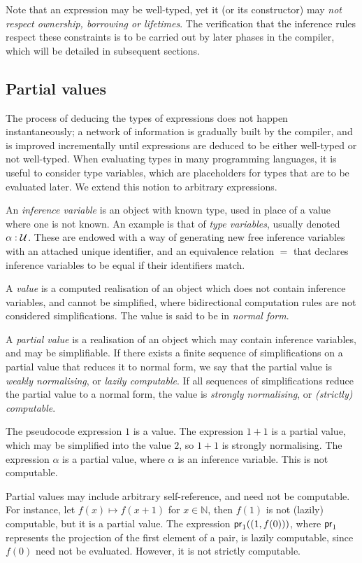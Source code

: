 \documentclass[11pt]{book}
\begin{document}
Note that an expression may be well-typed, yet it (or its constructor) may \textit{not respect ownership, borrowing or lifetimes}.
The verification that the inference rules respect these constraints is to be carried out by later phases in the compiler, which will be detailed in subsequent sections.

\subsection{Partial values}

The process of deducing the types of expressions does not happen instantaneously; a network of information is gradually built by the compiler, and is improved incrementally until expressions are deduced to be either well-typed or not well-typed.
When evaluating types in many programming languages, it is useful to consider type variables, which are placeholders for types that are to be evaluated later.
We extend this notion to arbitrary expressions.
\begin{defn}
  An \textit{inference variable} is an object with known type, used in place of a value where one is not known.
  An example is that of \textit{type variables}, usually denoted \( \alpha : \mathcal{U} \).
  These are endowed with a way of generating new free inference variables with an attached unique identifier, and an equivalence relation \( = \) that declares inference variables to be equal if their identifiers match.
\end{defn}
\begin{defn}
  A \textit{value} is a computed realisation of an object which does not contain inference variables, and cannot be simplified, where bidirectional computation rules are not considered simplifications.
  The value is said to be in \textit{normal form}.
\end{defn}
\begin{defn}
  A \textit{partial value} is a realisation of an object which may contain inference variables, and may be simplifiable.
  If there exists a finite sequence of simplifications on a partial value that reduces it to normal form, we say that the partial value is \textit{weakly normalising}, or \textit{lazily computable}.
  If all sequences of simplifications reduce the partial value to a normal form, the value is \textit{strongly normalising}, or \textit{(strictly) computable}.
\end{defn}
\begin{eg}
  The pseudocode expression \( 1 \) is a value.
  The expression \( 1 + 1 \) is a partial value, which may be simplified into the value \( 2 \), so \( 1 + 1 \) is strongly normalising.
  The expression \( \alpha \) is a partial value, where \( \alpha \) is an inference variable.
  This is not computable.
\end{eg}
Partial values may include arbitrary self-reference, and need not be computable.
For instance, let \( f(x) \mapsto f(x+1) \) for \( x \in \mathbb N \), then \( f(1) \) is not (lazily) computable, but it is a partial value.
The expression \( \mathsf{pr}_{1}((1, f(0))) \), where \( \mathsf{pr}_{1} \) represents the projection of the first element of a pair, is lazily computable, since \( f(0) \) need not be evaluated.
However, it is not strictly computable.
\end{document}
